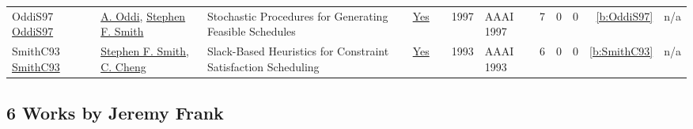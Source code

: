 {\begin{longtable}{>{\raggedright\arraybackslash}p{3cm}>{\raggedright\arraybackslash}p{6cm}>{\raggedright\arraybackslash}p{6.5cm}rrrp{2.5cm}rrrrr}
OddiS97 \href{http://www.aaai.org/Library/AAAI/1997/aaai97-048.php}{OddiS97} & \hyperref[auth:a284]{A. Oddi}, \hyperref[auth:a300]{Stephen F. Smith} & Stochastic Procedures for Generating Feasible Schedules & \href{../works/OddiS97.pdf}{Yes} & \cite{OddiS97} & 1997 & AAAI 1997 & 7 & 0 & 0 & \ref{b:OddiS97} & n/a\\
SmithC93 \href{http://www.aaai.org/Library/AAAI/1993/aaai93-022.php}{SmithC93} & \hyperref[auth:a300]{Stephen F. Smith}, \hyperref[auth:a1300]{C. Cheng} & Slack-Based Heuristics for Constraint Satisfaction Scheduling & \href{../works/SmithC93.pdf}{Yes} & \cite{SmithC93} & 1993 & AAAI 1993 & 6 & 0 & 0 & \ref{b:SmithC93} & n/a\\
\end{longtable}
}

\clearpage
\subsection{6 Works by Jeremy Frank}
\label{sec:a382}

